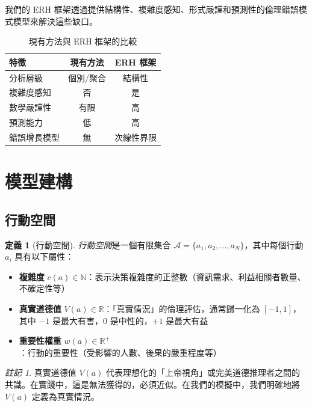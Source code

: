 \documentclass[12pt,a4paper]{article}
\theoremstyle{definition}
\newtheorem{definition}[theorem]{定義}
\theoremstyle{remark}
\newtheorem{remark}[theorem]{註記}
\begin{document}
我們的 ERH 框架透過提供結構性、複雜度感知、形式嚴謹和預測性的倫理錯誤模式模型來解決這些缺口。

\begin{table}[htbp]
\centering
\caption{現有方法與 ERH 框架的比較}
\label{tab:comparison}
\begin{tabular}{lcc}
\toprule
\textbf{特徵} & \textbf{現有方法} & \textbf{ERH 框架} \\
\midrule
分析層級 & 個別/聚合 & 結構性 \\
複雜度感知 & 否 & 是 \\
數學嚴謹性 & 有限 & 高 \\
預測能力 & 低 & 高 \\
錯誤增長模型 & 無 & 次線性界限 \\
\bottomrule
\end{tabular}
\end{table}

\section{模型建構}
\label{sec:formalization}

\subsection{行動空間}

\begin{definition}[行動空間]
\emph{行動空間}是一個有限集合 $\mathcal{A} = \{a_1, a_2, \ldots, a_N\}$，其中每個行動 $a_i$ 具有以下屬性：
\begin{itemize}
    \item \textbf{複雜度} $c(a) \in \mathbb{N}$：表示決策複雜度的正整數（資訊需求、利益相關者數量、不確定性等）
    \item \textbf{真實道德值} $V(a) \in \mathbb{R}$：「真實情況」的倫理評估，通常歸一化為 $[-1, 1]$，其中 $-1$ 是最大有害，$0$ 是中性的，$+1$ 是最大有益
    \item \textbf{重要性權重} $w(a) \in \mathbb{R}^+$：行動的重要性（受影響的人數、後果的嚴重程度等）
\end{itemize}
\end{definition}

\begin{remark}
真實道德值 $V(a)$ 代表理想化的「上帝視角」或完美道德推理者之間的共識。在實踐中，這是無法獲得的，必須近似。在我們的模擬中，我們明確地將 $V(a)$ 定義為真實情況。
\end{remark}
\end{document}
